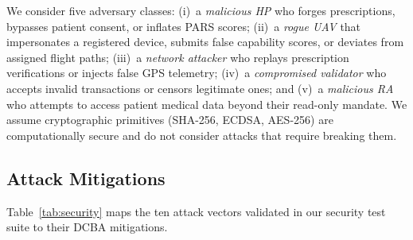 \documentclass[sigplan,screen]{acmart}
\newcommand{\dcba}{\textsc{DCBA}\xspace}
\newcommand{\pars}{\textsc{PARS}\xspace}
\begin{document}
We consider five adversary classes: (i)~a \emph{malicious HP} who forges
prescriptions, bypasses patient consent, or inflates \pars scores;
(ii)~a \emph{rogue UAV} that impersonates a registered device, submits false
capability scores, or deviates from assigned flight paths;
(iii)~a \emph{network attacker} who replays prescription verifications or
injects false GPS telemetry;
(iv)~a \emph{compromised validator} who accepts invalid transactions or
censors legitimate ones; and
(v)~a \emph{malicious RA} who attempts to access patient medical data beyond
their read-only mandate.
We assume cryptographic primitives (SHA-256, ECDSA, AES-256) are computationally
secure and do not consider attacks that require breaking them.

\subsection{Attack Mitigations}

Table~\ref{tab:security} maps the ten attack vectors validated in our security
test suite to their \dcba mitigations.
\end{document}
